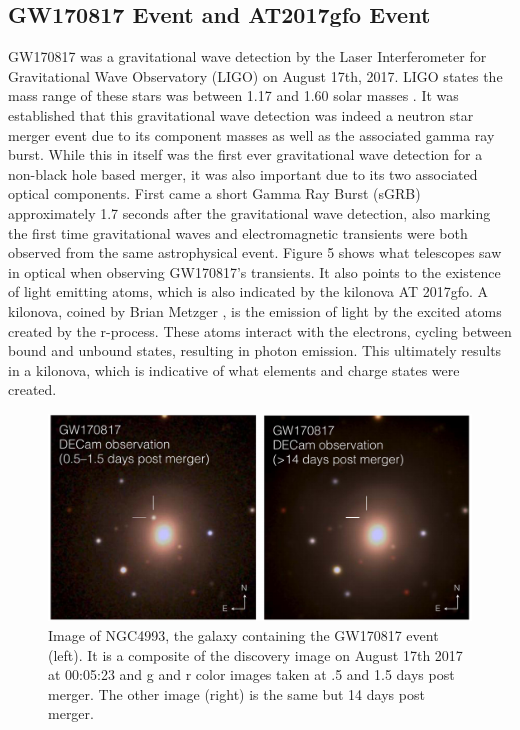 \documentclass[11pt,a4paper]{article}
\begin{document}
\subsection{GW170817 Event and AT2017gfo Event}

GW170817 was a gravitational wave  detection by the Laser Interferometer for Gravitational Wave Observatory (LIGO) on August 17th, 2017. LIGO states the mass range of these stars was between 1.17 and 1.60 solar masses \cite{Abbott_2017} . It was established that this gravitational wave detection was indeed a neutron star merger event due to its component masses as well as the associated gamma ray burst. While this in itself was the first ever gravitational wave detection for a non-black hole based merger, it was also important due to its two associated optical components. 
First came a short Gamma Ray Burst (sGRB) approximately 1.7 seconds after the gravitational wave detection, also marking the first time gravitational waves and electromagnetic transients were both observed from the same astrophysical event. Figure 5 shows what telescopes saw in optical when observing GW170817's transients. It also points to the existence of light emitting atoms, which is also indicated by the kilonova AT 2017gfo. A kilonova, coined by Brian Metzger \cite{Metzger_2019} , is the emission of light by the excited atoms created by the r-process. These atoms interact with the electrons, cycling between bound and unbound states, resulting in photon emission. This ultimately results in a kilonova, which is indicative of what elements and charge states were created. 

\begin{figure}[h!]
  \includegraphics[scale = .5, width=1\textwidth]{GW170817_pic.png}
  \caption{Image of NGC4993, the galaxy containing the GW170817 event \cite{Doctor_2019} (left). It is a composite of the discovery image on August 17th 2017 at 00:05:23 and g and r color images taken at .5 and 1.5 days post merger. The other image (right) is the same but 14 days post merger. }
\end{figure}
\end{document}
